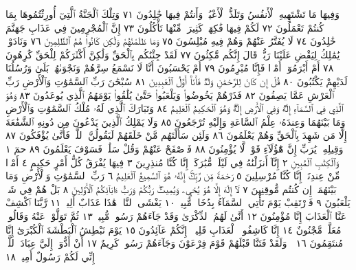 وَفِيهَا مَا تَشْتَهِيهِ ٱلْأَنفُسُ وَتَلَذُّ ٱلْأَعْيُنُۖ وَأَنتُمْ فِيهَا
خَٰلِدُونَ ٧١ وَتِلْكَ ٱلْجَنَّةُ ٱلَّتِيٓ أُورِثْتُمُوهَا بِمَا كُنتُمْ
تَعْمَلُونَ ٧٢ لَكُمْ فِيهَا فَٰكِهَةࣱ كَثِيرَةࣱ مِّنْهَا تَأْكُلُونَ ٧٣
إِنَّ ٱلْمُجْرِمِينَ فِي عَذَابِ جَهَنَّمَ خَٰلِدُونَ ٧٤ لَا يُفَتَّرُ عَنْهُمْ وَهُمْ
فِيهِ مُبْلِسُونَ ٧٥ وَمَا ظَلَمْنَٰهُمْ وَلَٰكِن كَانُوا۟ هُمُ ٱلظَّٰلِمِينَ ٧٦
وَنَادَوْا۟ يَٰمَٰلِكُ لِيَقْضِ عَلَيْنَا رَبُّكَۖ قَالَ إِنَّكُم مَّٰكِثُونَ ٧٧ لَقَدْ
جِئْنَٰكُم بِٱلْحَقِّ وَلَٰكِنَّ أَكْثَرَكُمْ لِلْحَقِّ كَٰرِهُونَ ٧٨ أَمْ أَبْرَمُوٓا۟ أَمْرࣰا
فَإِنَّا مُبْرِمُونَ ٧٩ أَمْ يَحْسَبُونَ أَنَّا لَا نَسْمَعُ سِرَّهُمْ وَنَجْوَىٰهُمۚ بَلَىٰ
وَرُسُلُنَا لَدَيْهِمْ يَكْتُبُونَ ٨٠ قُلْ إِن كَانَ لِلرَّحْمَٰنِ وَلَدࣱ فَأَنَا۠ أَوَّلُ
ٱلْعَٰبِدِينَ ٨١ سُبْحَٰنَ رَبِّ ٱلسَّمَٰوَٰتِ وَٱلْأَرْضِ رَبِّ ٱلْعَرْشِ
عَمَّا يَصِفُونَ ٨٢ فَذَرْهُمْ يَخُوضُوا۟ وَيَلْعَبُوا۟ حَتَّىٰ يُلَٰقُوا۟ يَوْمَهُمُ
ٱلَّذِي يُوعَدُونَ ٨٣ وَهُوَ ٱلَّذِي فِي ٱلسَّمَآءِ إِلَٰهࣱ وَفِي ٱلْأَرْضِ
إِلَٰهࣱۚ وَهُوَ ٱلْحَكِيمُ ٱلْعَلِيمُ ٨٤ وَتَبَارَكَ ٱلَّذِي لَهُۥ مُلْكُ ٱلسَّمَٰوَٰتِ
وَٱلْأَرْضِ وَمَا بَيْنَهُمَا وَعِندَهُۥ عِلْمُ ٱلسَّاعَةِ وَإِلَيْهِ تُرْجَعُونَ ٨٥
وَلَا يَمْلِكُ ٱلَّذِينَ يَدْعُونَ مِن دُونِهِ ٱلشَّفَٰعَةَ إِلَّا مَن
شَهِدَ بِٱلْحَقِّ وَهُمْ يَعْلَمُونَ ٨٦ وَلَئِن سَأَلْتَهُم مَّنْ خَلَقَهُمْ
لَيَقُولُنَّ ٱللَّهُۖ فَأَنَّىٰ يُؤْفَكُونَ ٨٧ وَقِيلِهِۦ يَٰرَبِّ إِنَّ هَٰٓؤُلَآءِ قَوْمࣱ
لَّا يُؤْمِنُونَ ٨٨ فَٱصْفَحْ عَنْهُمْ وَقُلْ سَلَٰمࣱۚ فَسَوْفَ يَعْلَمُونَ ٨٩
حمٓ ١ وَٱلْكِتَٰبِ ٱلْمُبِينِ ٢ إِنَّآ أَنزَلْنَٰهُ فِي لَيْلَةࣲ مُّبَٰرَكَةٍۚ
إِنَّا كُنَّا مُنذِرِينَ ٣ فِيهَا يُفْرَقُ كُلُّ أَمْرٍ حَكِيمٍ ٤ أَمْرࣰا
مِّنْ عِندِنَآۚ إِنَّا كُنَّا مُرْسِلِينَ ٥ رَحْمَةࣰ مِّن رَّبِّكَۚ إِنَّهُۥ هُوَ
ٱلسَّمِيعُ ٱلْعَلِيمُ ٦ رَبِّ ٱلسَّمَٰوَٰتِ وَٱلْأَرْضِ وَمَا بَيْنَهُمَآۖ
إِن كُنتُم مُّوقِنِينَ ٧ لَآ إِلَٰهَ إِلَّا هُوَ يُحْيِۦ وَيُمِيتُۖ رَبُّكُمْ
وَرَبُّ ءَابَآئِكُمُ ٱلْأَوَّلِينَ ٨ بَلْ هُمْ فِي شَكࣲّ يَلْعَبُونَ ٩
فَٱرْتَقِبْ يَوْمَ تَأْتِي ٱلسَّمَآءُ بِدُخَانࣲ مُّبِينࣲ ١٠ يَغْشَى ٱلنَّاسَۖ
هَٰذَا عَذَابٌ أَلِيمࣱ ١١ رَّبَّنَا ٱكْشِفْ عَنَّا ٱلْعَذَابَ إِنَّا مُؤْمِنُونَ ١٢
أَنَّىٰ لَهُمُ ٱلذِّكْرَىٰ وَقَدْ جَآءَهُمْ رَسُولࣱ مُّبِينࣱ ١٣ ثُمَّ تَوَلَّوْا۟
عَنْهُ وَقَالُوا۟ مُعَلَّمࣱ مَّجْنُونٌ ١٤ إِنَّا كَاشِفُوا۟ ٱلْعَذَابِ قَلِيلًاۚ إِنَّكُمْ
عَآئِدُونَ ١٥ يَوْمَ نَبْطِشُ ٱلْبَطْشَةَ ٱلْكُبْرَىٰٓ إِنَّا مُنتَقِمُونَ ١٦
۞ وَلَقَدْ فَتَنَّا قَبْلَهُمْ قَوْمَ فِرْعَوْنَ وَجَآءَهُمْ رَسُولࣱ كَرِيمٌ ١٧
أَنْ أَدُّوٓا۟ إِلَيَّ عِبَادَ ٱللَّهِۖ إِنِّي لَكُمْ رَسُولٌ أَمِينࣱ ١٨
